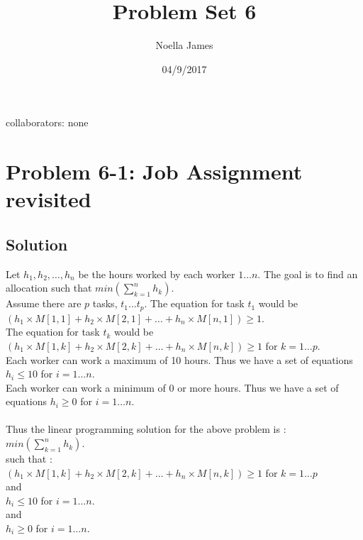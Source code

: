 \documentclass{article}
\theoremstyle{definition}
\theoremstyle{remark}
\theoremstyle{plain}
\begin{document}
\title{Problem Set 6}
\date{04/9/2017}
\author{Noella James}
\maketitle
collaborators: none\\

\section*{Problem 6-1: Job Assignment revisited}

\subsection*{Solution}

Let $h_1, h_2, \ldots, h_n$ be the hours worked by each worker $1 \ldots n$. The goal is to find an allocation such that $min(\sum_{k=1}^{n} h_k)$. \\

Assume there are $p$ tasks, $t_1 \ldots t_p$. The equation for task $t_1$ would be $(h_1 \times M[1,1] + h_2 \times M[2,1] + \ldots + h_n \times M[n,1]) \geq 1$.\\
The equation for task $t_k$  would be $(h_1 \times M[1,k] + h_2 \times M[2,k] + \ldots + h_n \times M[n,k]) \geq 1$ for $k = 1 \ldots p$. \\
Each worker can work a maximum of 10 hours. Thus we have a set of equations $h_i \leq 10$ for $i = 1 \ldots n$.\\
Each worker can work a minimum of 0 or more hours. Thus we have a set of equations $h_i \geq 0$ for $i = 1 \ldots n$.\\\\
Thus the linear programming solution for the above problem is : \\
$min(\sum_{k=1}^{n} h_k)$.\\
such that : \\
$(h_1 \times M[1,k] + h_2 \times M[2,k] + \ldots + h_n \times M[n,k]) \geq 1$ for $k = 1 \ldots p$ \\
and \\
$h_i \leq 10$ for $i = 1 \ldots n$. \\
and \\
 $h_i \geq 0$ for $i = 1 \ldots n$.
\end{document}
